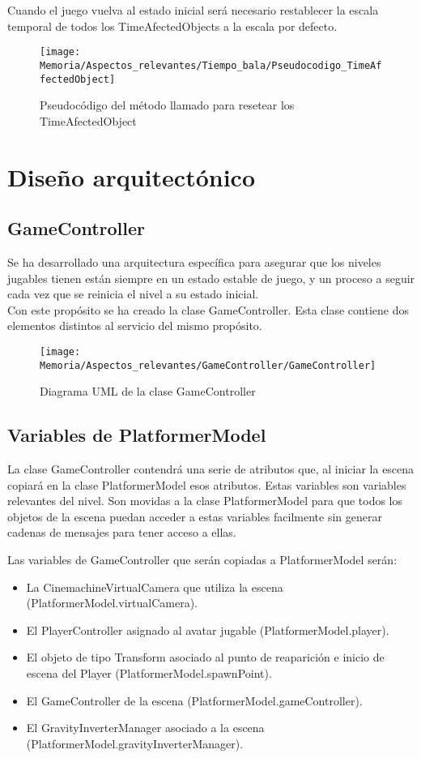 Cuando el juego vuelva al estado inicial será necesario restablecer la escala temporal de todos los TimeAfectedObjects a la escala por defecto.

\begin{figure}[h]
\texttt{[image: Memoria/Aspectos\_relevantes/Tiempo\_bala/Pseudocodigo\_TimeAffectedObject]}
\caption{Pseudocódigo del método llamado para resetear los TimeAfectedObject}
\end{figure} 

\section{Diseño arquitectónico}
\subsection{GameController}
Se ha desarrollado una arquitectura específica para asegurar que los niveles jugables tienen están siempre en un estado estable de juego, y un proceso a seguir cada vez que se reinicia el nivel a su estado inicial.\\
Con este propósito se ha creado la clase GameController. Esta clase contiene dos elementos distintos al servicio del mismo propósito.

\begin{figure}[h]
\centering
\texttt{[image: Memoria/Aspectos\_relevantes/GameController/GameController]}
\caption{Diagrama UML de la clase GameController}
\end{figure}

\subsection{Variables de PlatformerModel}
La clase GameController contendrá una serie de atributos que, al iniciar la escena copiará en la clase PlatformerModel esos atributos. Estas variables son variables relevantes del nivel. Son movidas a la clase PlatformerModel para que todos los objetos de la escena puedan acceder a estas variables facilmente sin generar cadenas de mensajes para tener acceso a ellas.

Las variables de GameController que serán copiadas a PlatformerModel serán:
\begin{itemize}
\item
La CinemachineVirtualCamera que utiliza la escena (PlatformerModel.virtualCamera).
\item
El PlayerController asignado al avatar jugable (PlatformerModel.player).
\item
El objeto de tipo Transform asociado al punto de reaparición e inicio de escena del Player (PlatformerModel.spawnPoint).
\item
El GameController de la escena (PlatformerModel.gameController).
\item
El GravityInverterManager asociado a la escena \\ (PlatformerModel.gravityInverterManager).
\end{itemize}

